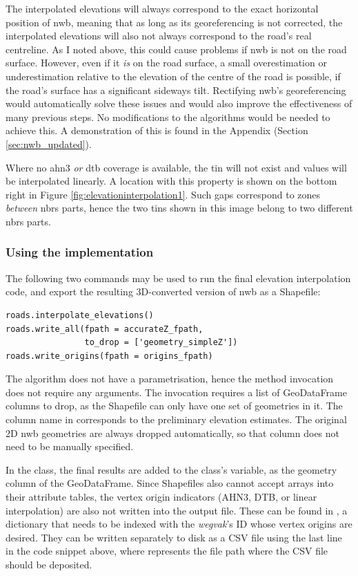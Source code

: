 The interpolated elevations will always correspond to the exact horizontal position of \ac{nwb}, meaning that as long as its georeferencing is not corrected, the interpolated elevations will also not always correspond to the road's real centreline. As I noted above, this could cause problems if \ac{nwb} is not on the road surface. However, even if it \textit{is} on the road surface, a small overestimation or underestimation relative to the elevation of the centre of the road is possible, if the road's surface has a significant sideways tilt. Rectifying \ac{nwb}'s georeferencing would automatically solve these issues and would also improve the effectiveness of many previous steps. No modifications to the algorithms would be needed to achieve this. A demonstration of this is found in the Appendix (Section \ref{sec:nwb_updated}).

Where no \ac{ahn3} \textit{or} \ac{dtb} coverage is available, the \ac{tin} will not exist and values will be interpolated linearly. A location with this property is shown on the bottom right in Figure \ref{fig:elevationinterpolation1}. Such gaps correspond to zones \textit{between} \ac{nbrs} parts, hence the two \ac{tin}s shown in this image belong to two different \ac{nbrs} parts.

\subsubsection{Using the implementation}

The following two commands may be used to run the final elevation interpolation code, and export the resulting 3D-converted version of \ac{nwb} as a Shapefile:

\begin{verbatim}
roads.interpolate_elevations()
roads.write_all(fpath = accurateZ_fpath,
                to_drop = ['geometry_simpleZ'])
roads.write_origins(fpath = origins_fpath)
\end{verbatim}

The algorithm does not have a parametrisation, hence the method invocation does not require any arguments. The  invocation requires a list of GeoDataFrame columns to drop, as the Shapefile can only have one set of geometries in it. The column name in  corresponds to the preliminary elevation estimates. The original 2D \ac{nwb} geometries are always dropped automatically, so that column does not need to be manually specified.

In the  class, the final results are added to the class's  variable, as the  geometry column of the GeoDataFrame. Since Shapefiles also cannot accept arrays into their attribute tables, the vertex origin indicators (AHN3, DTB, or linear interpolation) are also not written into the output file. These can be found in , a dictionary that needs to be indexed with the \textit{wegvak}'s ID whose vertex origins are desired. They can be written separately to disk as a CSV file using the last line in the code snippet above, where  represents the file path where the CSV file should be deposited.

